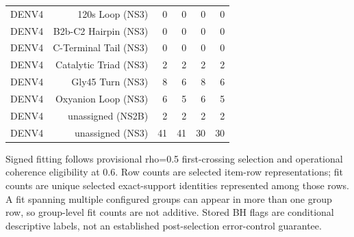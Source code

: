 \begin{table}[t]
\begin{tabular}{lrrrrr}
    DENV4 & 120s Loop (NS3) & 0 & 0 & 0 & 0 \\
    DENV4 & B2b-C2 Hairpin (NS3) & 0 & 0 & 0 & 0 \\
    DENV4 & C-Terminal Tail (NS3) & 0 & 0 & 0 & 0 \\
    DENV4 & Catalytic Triad (NS3) & 2 & 2 & 2 & 2 \\
    DENV4 & Gly45 Turn (NS3) & 8 & 6 & 8 & 6 \\
    DENV4 & Oxyanion Loop (NS3) & 6 & 5 & 6 & 5 \\
    DENV4 & unassigned (NS2B) & 2 & 2 & 2 & 2 \\
    DENV4 & unassigned (NS3) & 41 & 41 & 30 & 30 \\
    \bottomrule
  \end{tabular}
  \par\smallskip
  \begin{minipage}{0.98\linewidth}\footnotesize
  Signed fitting follows provisional rho=0.5 first-crossing selection and operational coherence eligibility at 0.6. Row counts are selected item-row representations; fit counts are unique selected exact-support identities represented among those rows. A fit spanning multiple configured groups can appear in more than one group row, so group-level fit counts are not additive. Stored BH flags are conditional descriptive labels, not an established post-selection error-control guarantee.
  \end{minipage}
\end{table}
